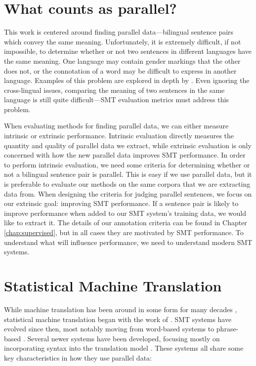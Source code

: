 \section{What counts as parallel?}
This work is centered around finding parallel data---bilingual sentence pairs
which convey the same meaning. Unfortunately, it is extremely difficult, if not
impossible, to determine whether or not two sentences in different languages
have the same meaning. One language may contain gender markings that the other
does not, or the connotation of a word may be difficult to express in another
language. Examples of this problem are explored in depth by \citet{Kay97}. 
Even ignoring the cross-lingual issues, comparing the meaning of two sentences
in the same language is still quite difficult---SMT evaluation metrics
\citep{Papineni02,Banerjee05,Snover06} must address this problem.

When evaluating methods for finding parallel data, we can either measure
intrinsic or extrinsic performance. Intrinsic evaluation directly measures the
quantity and quality of parallel data we extract, while extrinsic evaluation is
only concerned with how the new parallel data improves SMT performance.
In order to perform intrinsic evaluation, we need some criteria for determining whether or not a bilingual
sentence pair is parallel. This is easy if we use parallel data, but
it is preferable to evaluate our methods on the same corpora that we are
extracting data from. When designing the criteria for judging parallel
sentences, we focus on our extrinsic goal: improving SMT performance. If a sentence pair
is likely to improve performance when added to our SMT system's training data,
we would like to extract it. The details of our annotation criteria can be found
in Chapter \ref{chap:supervised}, but in all cases they are motivated by SMT
performance. To understand what will influence performance, we need to
understand modern SMT systems.

\section{Statistical Machine Translation}
While machine translation has been around in some form for many decades
\citep{Locke55}, statistical machine translation began with the work of
\citet{Brown88,Brown90,Brown93}. SMT systems have evolved since then, most notably moving from
word-based systems to phrase-based \citep{Koehn03}. Several newer systems have
been developed, focusing mostly on incorporating syntax into the translation
model \citep{Chiang05,Quirk05,Liu06,Galley06}. These systems all share some key
characteristics in how they use parallel data:

